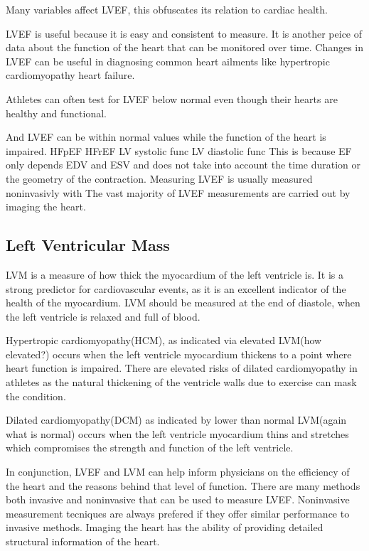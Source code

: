 \documentclass[12pt]{article}
\begin{document}
Many variables affect LVEF, this obfuscates its relation to cardiac health. 

LVEF is useful because it is easy and consistent to measure. It is another peice of data about the function of the heart that can be monitored over time.
Changes in LVEF can be useful in diagnosing common heart ailments like hypertropic cardiomyopathy heart failure.

Athletes can often test for LVEF below normal even though their hearts are healthy and functional\cite{ef_soa}.

And LVEF can be within normal values while the function of the heart is impaired.
HFpEF
HFrEF
LV systolic func
LV diastolic func
This is because EF only depends EDV and ESV and does not take into account the time duration or the geometry of the contraction.
Measuring LVEF is usually measured noninvasivly with 
The vast majority of LVEF measurements are carried out by imaging the heart.
 \cite{understanding-echo}
%

\subsection{Left Ventricular Mass}
LVM is a measure of how thick the myocardium of the left ventricle is.
It is a strong predictor for cardiovascular events\cite{cardiac_chamber_quant_update}, as it is an excellent indicator of the health of the myocardium.
LVM should be measured at the end of diastole, when the left ventricle is relaxed and full of blood.

Hypertropic cardiomyopathy(HCM), as indicated via elevated LVM(how elevated?) occurs when the left ventricle myocardium thickens to a point where heart function is impaired.
There are elevated risks of dilated cardiomyopathy in athletes as the natural thickening of the ventricle walls due to exercise can mask the condition.

Dilated cardiomyopathy(DCM) as indicated by lower than normal LVM(again what is normal) occurs when the left ventricle myocardium thins and stretches which compromises the strength and function of the left ventricle. 

In conjunction, LVEF and LVM can help inform physicians on the efficiency of the heart and the reasons behind that level of function.
There are many methods both invasive and noninvasive that can be used to measure LVEF.
Noninvasive measurement tecniques are always prefered if they offer similar performance to invasive methods.
Imaging the heart has the ability of providing detailed structural information of the heart.
\end{document}
